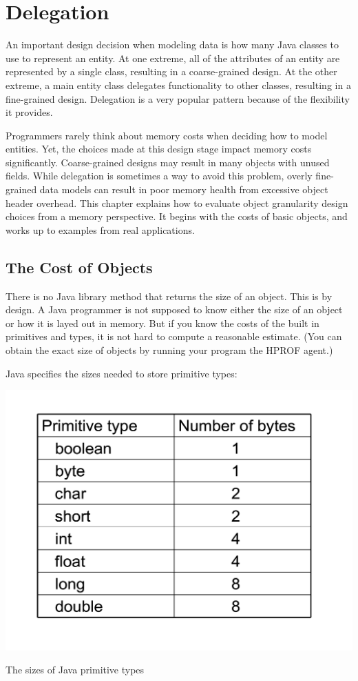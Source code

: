 \documentclass{book}
\theoremstyle{definition}
\begin{document}
\chapter{Delegation}

An important design decision when modeling data is how many Java classes to use to represent an entity. At one extreme, all of the attributes of an entity are represented by a single class, resulting in a coarse-grained design. At the other extreme, a main entity class delegates functionality to other classes, resulting in a fine-grained design.  Delegation is a very popular pattern because of the flexibility it provides. 

Programmers rarely think about memory costs when deciding how to model entities. Yet, the choices made at this design stage impact memory costs significantly. Coarse-grained designs may result in many objects with unused fields. While delegation is sometimes a way to avoid this problem, overly fine-grained data models can result in poor memory health from excessive object header overhead. This chapter explains how to evaluate object granularity design choices from a memory perspective. It begins with the costs of basic objects, and works up to examples from real applications.
  
\section{The Cost of Objects}
\label{sec:CostOfObjects}

There is no Java library method that returns the size of an object. This is by design. A Java programmer is not supposed to know either the size of an object or how it is layed out in memory. But if you know the costs of the built in primitives and types, it is not hard to compute a reasonable estimate. (You can obtain the exact size of objects by running your program the HPROF agent.)  

Java specifies the sizes needed to store primitive types:
\begin{table}
  \centering
 \includegraphics[width=.40\textwidth]{Figures/chapter4/primitive-byte-sizes.pdf}
  \caption{The sizes of Java primitive types}
  \label{tab:primitive-sizes}
\end{table}
\end{document}
